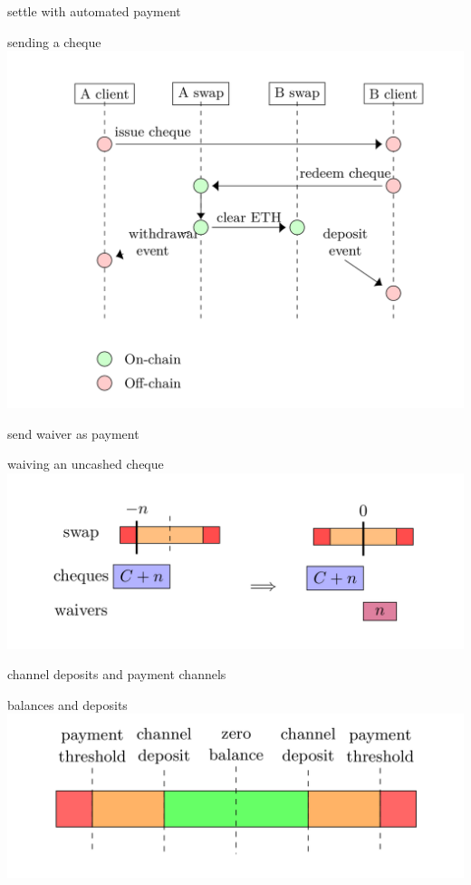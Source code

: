\documentclass{beamer}
\begin{document}
\begin{frame}{settle with automated payment}
\begin{block}{sending a cheque}
\includegraphics[width=\textwidth]{cheque-sequence.png}
\end{block}
\end{frame}

\begin{frame}{send waiver as payment}
\begin{block}{waiving an uncashed cheque}
  \includegraphics[width=\textwidth]{waiver.png}
\end{block}
\end{frame}


\begin{frame}{channel deposits and payment channels}
\begin{block}{balances and deposits}
  \includegraphics[width=\textwidth]{payment-channel.png}
\end{block}
\end{frame}
\end{document}
